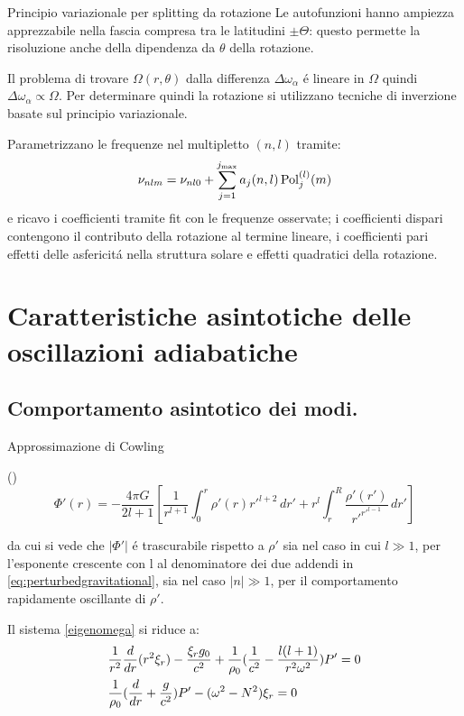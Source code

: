 \begin{frame}{Principio variazionale per splitting da rotazione}
Le autofunzioni hanno ampiezza apprezzabile nella fascia compresa tra le latitudini $\pm\Theta$: questo permette la risoluzione anche della dipendenza da $\theta$ della rotazione.

Il problema di trovare $\Omega(r,\theta)$ dalla differenza $\Delta\omega_{\alpha}$ \'e lineare in $\Omega$ quindi $\Delta\omega_{\alpha}\propto\Omega$. Per determinare quindi la rotazione si utilizzano tecniche di inverzione basate sul principio variazionale.


Parametrizzano le frequenze nel multipletto $(n,l)$ tramite:
\begin{equation}
\nu_{nlm}=\nu_{nl0}+\sum_{j=1}^{j_{\max}}a_j(n,l)\operatorname{Pol}_j^{(l)}(m)\label{eq:freqmulti}
\end{equation}
e ricavo i coefficienti tramite fit con le frequenze osservate; i coefficienti dispari contengono il contributo della rotazione al termine lineare, i coefficienti pari effetti delle asfericit\'a nella struttura solare e effetti quadratici della rotazione.

\end{frame}

\section{Caratteristiche asintotiche delle oscillazioni adiabatiche}


\subsection{Comportamento asintotico dei modi.}

\begin{frame}{Approssimazione di Cowling}

(\cite{cow41oscillations})
\begin{equation}
\Phi'(r)=-\frac{4\pi G}{2l+1}\left[\frac{1}{r^{l+1}}\int_0^r\rho'(r)r'^{l+2}\,dr'+r^l\int_r^R\frac{\rho'(r')}{r'^{r'^{l-1}}}\,dr'\right]\label{eq:perturbedgravitational}
\end{equation}

da cui si vede che $|\Phi'|$ \'e trascurabile rispetto a $\rho'$ sia nel caso in cui $l\gg1$, per l'esponente crescente con l al denominatore dei due addendi in \eqref{eq:perturbedgravitational}, sia nel caso $|n|\gg1$, per il comportamento rapidamente oscillante di $\rho'$.

Il sistema \eqref{eigenomega} si riduce a:
\begin{subequations}\label{cowosc:main}
\begin{align}
&\frac{1}{r^2}\frac{d}{d r}(r^2\xi_r)-\frac{\xi_rg_0}{c^2}+\frac{1}{\rho_0}(\frac{1}{c^2}-\frac{l(l+1)}{r^2\omega^2})P'=0\label{cowosc:a}\\
&\frac{1}{\rho_0}(\frac{d}{d r}+\frac{g}{c^2})P'-(\omega^2-N^2)\xi_r=0\label{cowosc:b}
\end{align}
\end{subequations}

\end{frame}

